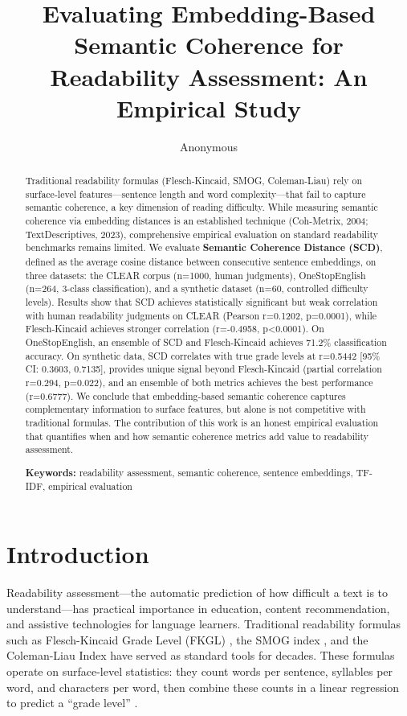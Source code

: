 \documentclass[11pt,letterpaper]{article}
\title{Evaluating Embedding-Based Semantic Coherence for Readability Assessment: An Empirical Study}
\author{Anonymous}
\date{}
\begin{document}
\maketitle

\begin{abstract}
Traditional readability formulas (Flesch-Kincaid, SMOG, Coleman-Liau) rely on surface-level features---sentence length and word complexity---that fail to capture semantic coherence, a key dimension of reading difficulty. While measuring semantic coherence via embedding distances is an established technique (Coh-Metrix, 2004; TextDescriptives, 2023), comprehensive empirical evaluation on standard readability benchmarks remains limited. We evaluate \textbf{Semantic Coherence Distance (SCD)}, defined as the average cosine distance between consecutive sentence embeddings, on three datasets: the CLEAR corpus (n=1000, human judgments), OneStopEnglish (n=264, 3-class classification), and a synthetic dataset (n=60, controlled difficulty levels). Results show that SCD achieves statistically significant but weak correlation with human readability judgments on CLEAR (Pearson r=0.1202, p=0.0001), while Flesch-Kincaid achieves stronger correlation (r=-0.4958, p<0.0001). On OneStopEnglish, an ensemble of SCD and Flesch-Kincaid achieves 71.2\% classification accuracy. On synthetic data, SCD correlates with true grade levels at r=0.5442 [95\% CI: 0.3603, 0.7135], provides unique signal beyond Flesch-Kincaid (partial correlation r=0.294, p=0.022), and an ensemble of both metrics achieves the best performance (r=0.6777). We conclude that embedding-based semantic coherence captures complementary information to surface features, but alone is not competitive with traditional formulas. The contribution of this work is an honest empirical evaluation that quantifies when and how semantic coherence metrics add value to readability assessment.

\textbf{Keywords:} readability assessment, semantic coherence, sentence embeddings, TF-IDF, empirical evaluation
\end{abstract}

\section{Introduction}

Readability assessment---the automatic prediction of how difficult a text is to understand---has practical importance in education, content recommendation, and assistive technologies for language learners. Traditional readability formulas such as Flesch-Kincaid Grade Level (FKGL) \cite{Kincaid1975}, the SMOG index \cite{McLaughlin1969}, and the Coleman-Liau Index \cite{Coleman1975} have served as standard tools for decades. These formulas operate on surface-level statistics: they count words per sentence, syllables per word, and characters per word, then combine these counts in a linear regression to predict a ``grade level'' \cite{Crossley2021}.
\end{document}
